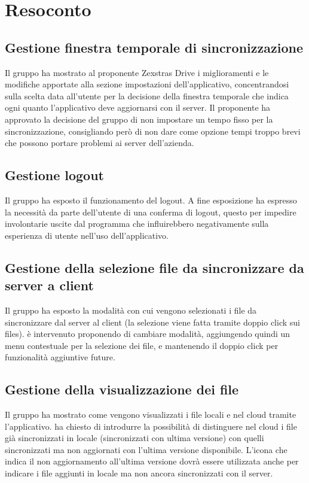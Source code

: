 \section{Resoconto}
\subsection{Gestione finestra temporale di sincronizzazione}
Il gruppo ha mostrato al proponente Zexstras Drive i miglioramenti e le modifiche apportate alla sezione impostazioni dell'applicativo, concentrandosi sulla scelta data all'utente per la decisione della finestra temporale che indica ogni quanto l'applicativo deve aggiornarsi con il server. Il proponente ha approvato la decisione del gruppo di non impostare un tempo fisso per la sincronizzazione, consigliando però di non dare come opzione tempi troppo brevi che possono portare problemi ai server dell'azienda.

\subsection{Gestione logout}
Il gruppo ha esposto il funzionamento del logout. A fine esposizione \textit{\Alessio{}} ha espresso la necessità da parte dell'utente di una conferma di logout, questo per impedire involontarie uscite dal programma che influirebbero negativamente sulla esperienza di utente nell'uso dell'applicativo.

\subsection{Gestione della selezione file da sincronizzare da server a client}
Il gruppo ha esposto la modalità con cui vengono selezionati i file da sincronizzare dal server al client (la selezione viene fatta tramite doppio click sui files). \textit{\Alessio{}} è intervenuto proponendo di cambiare modalità, aggiungendo quindi un menu contestuale per la selezione dei file, e mantenendo il doppio click per funzionalità aggiuntive future. 

\subsection{Gestione della visualizzazione dei file}
Il gruppo ha mostrato come vengono visualizzati i file locali e nel cloud tramite l'applicativo. \textit{\Alessio{}} ha chiesto di introdurre la possibilità di distinguere nel cloud i file già sincronizzati in locale (sincronizzati con ultima versione) con quelli sincronizzati ma non aggiornati con l'ultima versione disponibile. L'icona che indica il non aggiornamento all'ultima versione dovrà essere utilizzata anche per indicare i file aggiunti in locale ma non ancora sincronizzati con il server. 

